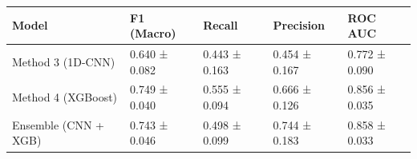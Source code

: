 \begin{tabular}{lllll}
\toprule
Model & F1 (Macro) & Recall & Precision & ROC AUC \\
\midrule
Method 3 (1D-CNN) & 0.640 ± 0.082 & 0.443 ± 0.163 & 0.454 ± 0.167 & 0.772 ± 0.090 \\
Method 4 (XGBoost) & 0.749 ± 0.040 & 0.555 ± 0.094 & 0.666 ± 0.126 & 0.856 ± 0.035 \\
Ensemble (CNN + XGB) & 0.743 ± 0.046 & 0.498 ± 0.099 & 0.744 ± 0.183 & 0.858 ± 0.033 \\
\bottomrule
\end{tabular}
